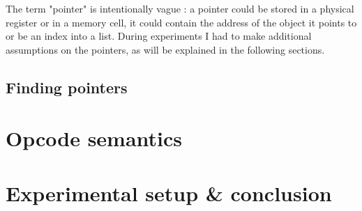 \documentclass[french]{article}
\begin{document}
The term "pointer" is intentionally vague : a pointer could be stored in a physical register or in a memory cell, it could contain the address of the object it points to or be an index into a list. During experiments I had to make additional assumptions on the pointers, as will be explained in the following sections.

\subsection{Finding pointers}










\section{Opcode semantics}


\section{Experimental setup \& conclusion}
\end{document}
